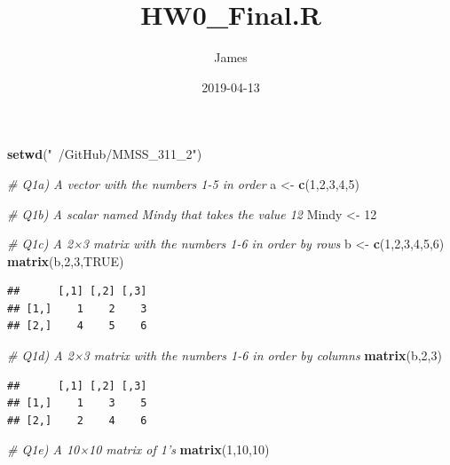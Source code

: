 \documentclass[]{article}
\title{HW0\_Final.R}
\author{James}
\date{2019-04-13}
\newenvironment{Shaded}{\begin{snugshade}}{\end{snugshade}}
\newcommand{\KeywordTok}[1]{\textcolor[rgb]{0.13,0.29,0.53}{\textbf{#1}}}
\newcommand{\DecValTok}[1]{\textcolor[rgb]{0.00,0.00,0.81}{#1}}
\newcommand{\StringTok}[1]{\textcolor[rgb]{0.31,0.60,0.02}{#1}}
\newcommand{\CommentTok}[1]{\textcolor[rgb]{0.56,0.35,0.01}{\textit{#1}}}
\newcommand{\OtherTok}[1]{\textcolor[rgb]{0.56,0.35,0.01}{#1}}
\newcommand{\NormalTok}[1]{#1}
\begin{document}
\maketitle

\begin{Shaded}
\begin{Highlighting}[]
\KeywordTok{setwd}\NormalTok{(}\StringTok{"~/GitHub/MMSS_311_2"}\NormalTok{)}

\CommentTok{# Q1a) A vector with the numbers 1-5 in order }
\NormalTok{a <-}\StringTok{ }\KeywordTok{c}\NormalTok{(}\DecValTok{1}\NormalTok{,}\DecValTok{2}\NormalTok{,}\DecValTok{3}\NormalTok{,}\DecValTok{4}\NormalTok{,}\DecValTok{5}\NormalTok{)}

\CommentTok{# Q1b) A scalar named Mindy that takes the value 12}
\NormalTok{Mindy <-}\StringTok{ }\DecValTok{12}

\CommentTok{# Q1c) A 2×3 matrix with the numbers 1-6 in order by rows }
\NormalTok{b <-}\StringTok{ }\KeywordTok{c}\NormalTok{(}\DecValTok{1}\NormalTok{,}\DecValTok{2}\NormalTok{,}\DecValTok{3}\NormalTok{,}\DecValTok{4}\NormalTok{,}\DecValTok{5}\NormalTok{,}\DecValTok{6}\NormalTok{)}
\KeywordTok{matrix}\NormalTok{(b,}\DecValTok{2}\NormalTok{,}\DecValTok{3}\NormalTok{,}\OtherTok{TRUE}\NormalTok{)}
\end{Highlighting}
\end{Shaded}

\begin{verbatim}
##      [,1] [,2] [,3]
## [1,]    1    2    3
## [2,]    4    5    6
\end{verbatim}

\begin{Shaded}
\begin{Highlighting}[]
\CommentTok{# Q1d) A 2×3 matrix with the numbers 1-6 in order by columns }
\KeywordTok{matrix}\NormalTok{(b,}\DecValTok{2}\NormalTok{,}\DecValTok{3}\NormalTok{)}
\end{Highlighting}
\end{Shaded}

\begin{verbatim}
##      [,1] [,2] [,3]
## [1,]    1    3    5
## [2,]    2    4    6
\end{verbatim}

\begin{Shaded}
\begin{Highlighting}[]
\CommentTok{# Q1e) A 10×10 matrix of 1's }
\KeywordTok{matrix}\NormalTok{(}\DecValTok{1}\NormalTok{,}\DecValTok{10}\NormalTok{,}\DecValTok{10}\NormalTok{)}
\end{Highlighting}
\end{Shaded}
\end{document}
